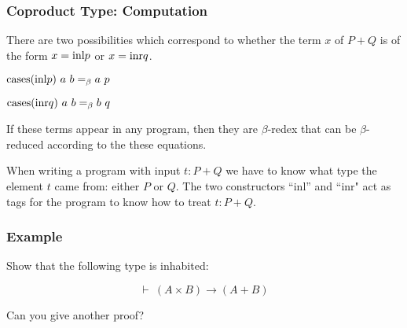 \documentclass{beamer}
\theoremstyle{indentDefn} \newtheorem{defn}[]{Definition}
\begin{document}
\begin{frame}
  \frametitle{Coproduct Type: Computation}

  There are two possibilities which correspond to whether the term $x$ of $P+Q$ is of the form $x = \text{inl} p$ or $x = \text{inr} q$. 

  \begin{center}
    $\sumElim (\inl p) \ a \ b =_{\beta} a \ p$ 

    $\sumElim (\inr q) \ a \ b =_{\beta} b \ q$
  \end{center}

  If these terms appear in any program, then they are $\beta$-redex that can be $\beta$-reduced according to the these equations. 

  \vspace{0.5cm}
  
  When writing a program with input $t : P+Q$ we have to know what type the element $t$ came from: either $P$ or $Q$. The two constructors ``inl'' and ``inr" act as tags for the program to know how to treat $t : P+Q$. 
\end{frame}

\begin{frame}
  \frametitle{Example}

  Show that the following type is inhabited:

  $$ \vdash \ (A \times B) \to (A + B)$$
  

  \vspace{5cm}
  Can you give another proof?
\end{frame}






\end{document}
